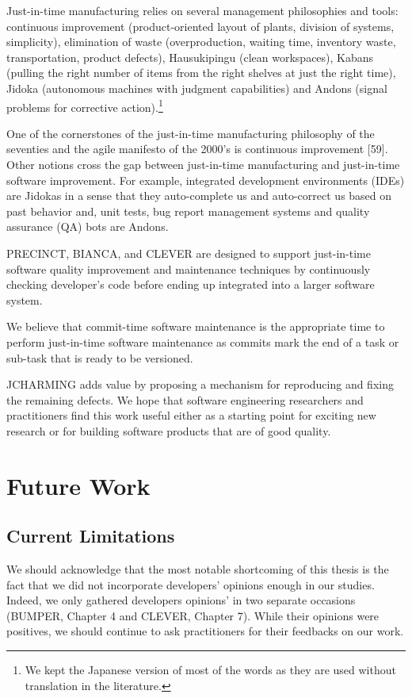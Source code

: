 \documentclass[12pt]{report}
\begin{document}
Just-in-time manufacturing relies on several management philosophies and
tools: continuous improvement (product-oriented layout of plants,
division of systems, simplicity), elimination of waste (overproduction,
waiting time, inventory waste, transportation, product defects),
Hausukipingu (clean workspaces), Kabans (pulling the right number of
items from the right shelves at just the right time), Jidoka (autonomous
machines with judgment capabilities) and Andons (signal problems for
corrective action).\footnote{We kept the Japanese version of most of the
  words as they are used without translation in the literature.}

One of the cornerstones of the just-in-time manufacturing philosophy of
the seventies and the agile manifesto of the 2000's is continuous
improvement {[}59{]}. Other notions cross the gap between just-in-time
manufacturing and just-in-time software improvement. For example,
integrated development environments (IDEs) are Jidokas in a sense that
they auto-complete us and auto-correct us based on past behavior and,
unit tests, bug report management systems and quality assurance (QA)
bots are Andons.

PRECINCT, BIANCA, and CLEVER are designed to support just-in-time
software quality improvement and maintenance techniques by continuously
checking developer's code before ending up integrated into a larger
software system.

We believe that commit-time software maintenance is the appropriate time
to perform just-in-time software maintenance as commits mark the end of
a task or sub-task that is ready to be versioned.

JCHARMING adds value by proposing a mechanism for reproducing and fixing
the remaining defects. We hope that software engineering researchers and
practitioners find this work useful either as a starting point for
exciting new research or for building software products that are of good
quality.

\section{Future Work}\label{future-work}

\subsection{Current Limitations}\label{current-limitations}

We should acknowledge that the most notable shortcoming of this thesis
is the fact that we did not incorporate developers' opinions enough in
our studies. Indeed, we only gathered developers opinions' in two
separate occasions (BUMPER, Chapter 4 and CLEVER, Chapter 7). While
their opinions were positives, we should continue to ask practitioners
for their feedbacks on our work.
\end{document}
